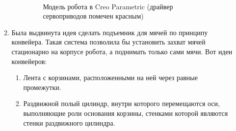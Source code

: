 \begin{enumerate}
\begin{enumerate}
\begin{enumerate}
			\begin{figure}[H]
				\begin{minipage}[h]{0.2\linewidth}
					\center  
				\end{minipage}
				\begin{minipage}[h]{0.6\linewidth}
					\caption{Модель робота в Creo Parametric (драйвер сервоприводов помечен красным)}
				\end{minipage}
			\end{figure}
			
		\end{enumerate}
		
		\item Была выдвинута идея сделать подъемник для мячей по принципу конвейера. Такая система позволила бы установить захват мячей стационарно на корпусе робота, а поднимать только сами мячи. Вот идеи конвейеров:
		\begin{enumerate}
			\item Лента с корзинами, расположенными на ней через равные промежутки.
			
			\item Раздвижной полый цилиндр, внутри которого перемещаются оси, выполняющие роли основания корзины, стенками которой являются стенки раздвижного цилиндра.
			

\end{enumerate}
\end{enumerate}
\end{enumerate}
